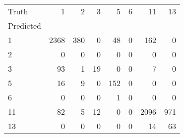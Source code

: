 \begin{tabular}{lrrrrrrr}
\toprule
Truth & 1 & 2 & 3 & 5 & 6 & 11 & 13 \\
Predicted &  &  &  &  &  &  &  \\
\midrule
1 & 2368 & 380 & 0 & 48 & 0 & 162 & 0 \\
2 & 0 & 0 & 0 & 0 & 0 & 0 & 0 \\
3 & 93 & 1 & 19 & 0 & 0 & 7 & 0 \\
5 & 16 & 9 & 0 & 152 & 0 & 0 & 0 \\
6 & 0 & 0 & 0 & 1 & 0 & 0 & 0 \\
11 & 82 & 5 & 12 & 0 & 0 & 2096 & 971 \\
13 & 0 & 0 & 0 & 0 & 0 & 14 & 63 \\
\bottomrule
\end{tabular}
